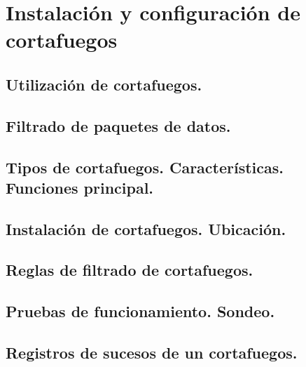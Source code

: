 \documentclass[letterpaper,10pt,spanish]{sphinxmanual}
\begin{document}
\chapter{Instalación y configuración de cortafuegos}
\label{\detokenize{tema_cortafuegos/tema_cortafuegos:instalacion-y-configuracion-de-cortafuegos}}\label{\detokenize{tema_cortafuegos/tema_cortafuegos::doc}}

\section{Utilización de cortafuegos.}
\label{\detokenize{tema_cortafuegos/tema_cortafuegos:utilizacion-de-cortafuegos}}

\section{Filtrado de paquetes de datos.}
\label{\detokenize{tema_cortafuegos/tema_cortafuegos:filtrado-de-paquetes-de-datos}}

\section{Tipos de cortafuegos. Características. Funciones principal.}
\label{\detokenize{tema_cortafuegos/tema_cortafuegos:tipos-de-cortafuegos-caracteristicas-funciones-principal}}

\section{Instalación de cortafuegos. Ubicación.}
\label{\detokenize{tema_cortafuegos/tema_cortafuegos:instalacion-de-cortafuegos-ubicacion}}

\section{Reglas de filtrado de cortafuegos.}
\label{\detokenize{tema_cortafuegos/tema_cortafuegos:reglas-de-filtrado-de-cortafuegos}}

\section{Pruebas de funcionamiento. Sondeo.}
\label{\detokenize{tema_cortafuegos/tema_cortafuegos:pruebas-de-funcionamiento-sondeo}}

\section{Registros de sucesos de un cortafuegos.}
\label{\detokenize{tema_cortafuegos/tema_cortafuegos:registros-de-sucesos-de-un-cortafuegos}}
\end{document}
